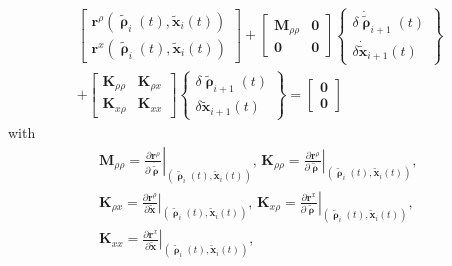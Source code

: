 \documentclass[twocolumn]{svjour3}
\begin{document}
\begin{equation}
\begin{split}
	\left[
		\begin{array}{c}
			\mathbf{r}^\rho(\tilde{\pmb\uprho}_i(t), \tilde{\mathbf{x}}_i(t))\\
			\mathbf{r}^x(\tilde{\pmb\uprho}_i(t), \tilde{\mathbf{x}}_i(t))
		\end{array}
	\right]
	+
	\left[
	\begin{array}{cc}
		\mathbf{M}_{\rho\rho} & \mathbf{0}\\
		\mathbf{0} & \mathbf{0}
	\end{array}
	\right]
	\left\{
		\begin{array}{c}
		\delta\dot{\tilde{\pmb\uprho}}_{i+1}(t)\\
		\delta\dot{\tilde{\mathbf{x}}}_{i+1}(t)
		\end{array}
	\right\}
	\\ + 
	\left[
		\begin{array}{cc}
			\mathbf{K}_{\rho\rho} & \mathbf{K}_{\rho x}\\
			\mathbf{K}_{x\rho} & \mathbf{K}_{xx}
		\end{array}
		\right]
		\left\{
			\begin{array}{c}
			\delta\tilde{\pmb\uprho}_{i+1}(t)\\
			\delta\tilde{\mathbf{x}}_{i+1}(t)
			\end{array}
		\right\}
		=
		\left[
			\begin{array}{c}
				\mathbf{0}\\
				\mathbf{0}
			\end{array}
		\right]
		\end{split}
		\label{eq:tangent_remodelling}
\end{equation}
with
\begin{equation}
\begin{split}
\mathbf{M}_{\rho\rho} = 
\left.
\frac{\partial \mathbf{r}^\rho}{\partial \dot{\tilde{\pmb\uprho}}}
\right|_{(\tilde{\pmb\uprho}_i(t),\tilde{\mathbf{x}}_i(t))},\,
\mathbf{K}_{\rho\rho} = 
\left. 
\frac{\partial \mathbf{r}^\rho}{\partial {\tilde{\pmb\uprho}}}
\right|_{(\tilde{\pmb\uprho}_i(t),\tilde{\mathbf{x}}_i(t))},\, \\
\mathbf{K}_{\rho x} = 
\left.
\frac{\partial \mathbf{r}^\rho}{\partial {\tilde{\mathbf{x}}}}
\right|_{(\tilde{\pmb\uprho}_i(t),\tilde{\mathbf{x}}_i(t))},\,
\mathbf{K}_{x \rho} = 
\left.
\frac{\partial \mathbf{r}^x}{\partial {\tilde{\pmb\uprho}}}
\right|_{(\tilde{\pmb\uprho}_i(t),\tilde{\mathbf{x}}_i(t))},\, \\
\mathbf{K}_{x x} = 
\left.
\frac{\partial \mathbf{r}^x}{\partial {\tilde{\mathbf{x}}}}
\right|_{(\tilde{\pmb\uprho}_i(t),\tilde{\mathbf{x}}_i(t))},
\end{split}
\end{equation}
\end{document}
